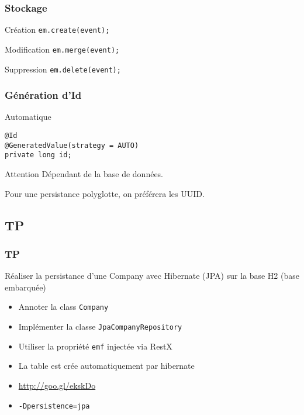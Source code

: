 \documentclass[t,12pt]{beamer}
\begin{document}
\begin{frame}
	\frametitle{Stockage}

	\begin{exampleblock}{Cr\'eation}
		\lstinline{em.create(event);}
	\end{exampleblock}

	\begin{block}{Modification}
		\lstinline{em.merge(event);}
	\end{block}

	\begin{alertblock}{Suppression}
		\lstinline{em.delete(event);}
	\end{alertblock}
\end{frame}

\begin{frame}[fragile]
	\frametitle{G\'en\'eration d'Id}

	\begin{block}{Automatique}
		\begin{lstlisting}[frame=none]
@Id
@GeneratedValue(strategy = AUTO)
private long id;
		\end{lstlisting}
	\end{block}

	\begin{alertblock}{Attention}
		D\'ependant de la base de donn\'ees.

		Pour une persistance polyglotte, on pr\'ef\'erera les UUID.
	\end{alertblock}
\end{frame}

\subsection{TP}

\begin{frame}
	\frametitle{TP}

	\begin{block}{R\'ealiser la persistance d'une Company avec Hibernate (JPA) sur la base H2 (base embarqu\'ee)}
		\begin{itemize}
			\item Annoter la class \lstinline{Company}
			\item Impl\'ementer la classe \lstinline{JpaCompanyRepository}
			\item Utiliser la propri\'et\'e \lstinline{emf} inject\'ee via RestX
			\item La table est cr\'ee automatiquement par hibernate
			\item \url{http://goo.gl/ekskDo}
			\item \lstinline{-Dpersistence=jpa}
		\end{itemize}
	\end{block}
\end{frame}
\end{document}
